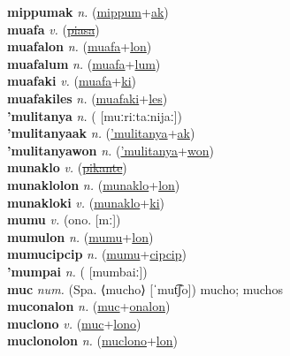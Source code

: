 \textbf{mippumak} \textit{n.} (\hyperref[mippum]{mippum}+\hyperref[ak]{ak})
 \label{mippumak} \\
\textbf{muafa} \textit{v.} (\hyperref[piasa]{\sout{piasa}})
 \label{muafa} \\
\textbf{muafalon} \textit{n.} (\hyperref[muafa]{muafa}+\hyperref[lon]{lon})
 \label{muafalon} \\
\textbf{muafalum} \textit{n.} (\hyperref[muafa]{muafa}+\hyperref[lum]{lum})
 \label{muafalum} \\
\textbf{muafaki} \textit{v.} (\hyperref[muafa]{muafa}+\hyperref[ki]{ki})
 \label{muafaki} \\
\textbf{muafakiles} \textit{n.} (\hyperref[muafaki]{muafaki}+\hyperref[les]{les})
 \label{muafakiles} \\
\textbf{'mulitanya} \textit{n.} ( [muːriːtaːnijaː])
 \label{'mulitanya} \\
\textbf{'mulitanyaak} \textit{n.} (\hyperref['mulitanya]{'mulitanya}+\hyperref[ak]{ak})
 \label{'mulitanyaak} \\
\textbf{'mulitanyawon} \textit{n.} (\hyperref['mulitanya]{'mulitanya}+\hyperref[won]{won})
 \label{'mulitanyawon} \\
\textbf{munaklo} \textit{v.} (\hyperref[pikante]{\sout{pikante}})
 \label{munaklo} \\
\textbf{munaklolon} \textit{n.} (\hyperref[munaklo]{munaklo}+\hyperref[lon]{lon})
 \label{munaklolon} \\
\textbf{munakloki} \textit{v.} (\hyperref[munaklo]{munaklo}+\hyperref[ki]{ki})
 \label{munakloki} \\
\textbf{mumu} \textit{v.} (ono. [mː])
 \label{mumu} \\
\textbf{mumulon} \textit{n.} (\hyperref[mumu]{mumu}+\hyperref[lon]{lon})
 \label{mumulon} \\
\textbf{mumucipcip} \textit{n.} (\hyperref[mumu]{mumu}+\hyperref[cipcip]{cipcip})
 \label{mumucipcip} \\
\textbf{'mumpai} \textit{n.} ( [mumbaiː])
 \label{'mumpai} \\
\textbf{muc} \textit{num.} (Spa. ⟨mucho⟩ [ˈmut͡ʃo])
mucho; muchos \label{muc} \\
\textbf{muconalon} \textit{n.} (\hyperref[muc]{muc}+\hyperref[onalon]{onalon})
 \label{muconalon} \\
\textbf{muclono} \textit{v.} (\hyperref[muc]{muc}+\hyperref[lono]{lono})
 \label{muclono} \\
\textbf{muclonolon} \textit{n.} (\hyperref[muclono]{muclono}+\hyperref[lon]{lon})
